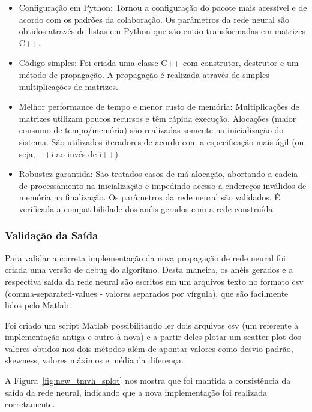 \documentclass[a4paper,10pt,titlepage]{article}
\begin{document}
\begin{itemize}
 \item Configuração em Python:
   \subitem Tornou a configuração do pacote mais acessível e de acordo com os padrões da colaboração.
   \subitem Os parâmetros da rede neural são obtidos através de listas em Python que são então transformadas em matrizes C++.
 \item Código simples:
   \subitem Foi criada uma classe C++ com construtor, destrutor e um método de propagação.
   \subitem A propagação é realizada através de simples multiplicações de matrizes.
 \item Melhor performance de tempo e menor custo de memória:
   \subitem Multiplicações de matrizes utilizam poucos recursos e têm rápida execução.
   \subitem Alocações (maior consumo de tempo/memória) são realizadas somente na inicialização do sistema.
   \subitem São utilizados iteradores de acordo com a especificação mais ágil (ou seja, ++i ao invés de i++).
 \item Robustez garantida:
   \subitem São tratados casos de má alocação, abortando a cadeia de processamento na inicialização e impedindo acesso a endereços inválidos de memória na finalização.
   \subitem Os parâmetros da rede neural são validados.
   \subitem É verificada a compatibilidade dos anéis gerados com a rede construída.
\end{itemize}

\subsubsection{Validação da Saída}

Para validar a correta implementação da nova propagação de rede neural foi criada uma versão de debug do algoritmo.
Desta maneira, os anéis gerados e a respectiva saída da rede neural são escritos em um arquivos texto no formato csv (comma-separated-values - valores separados por vírgula), que são facilmente lidos pelo Matlab.

Foi criado um script Matlab possibilitando ler dois arquivos csv (um referente à implementação antiga e outro à nova) e a partir deles plotar um scatter plot dos valores obtidos nos dois métodos além de apontar valores como desvio padrão, skewness, valores máximos e média da diferença.

A Figura~\ref{fig:new_tmvh_splot} nos mostra que foi mantida a consistência da saída da rede neural, indicando que a nova implementação foi realizada corretamente.
\end{document}
